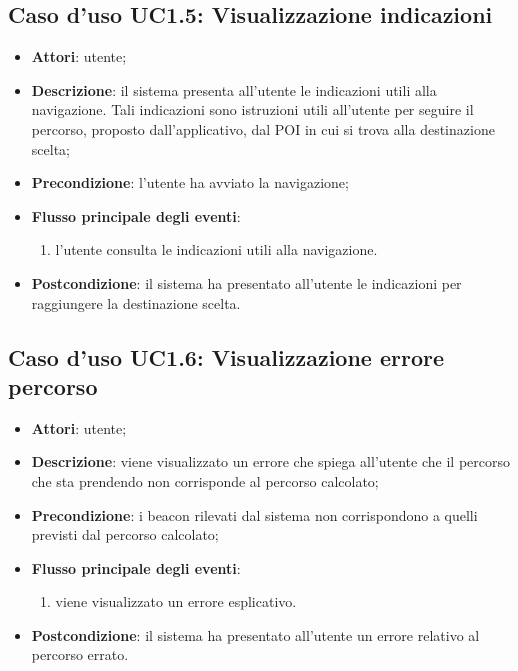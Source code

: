 \documentclass[../AnalisiDeiRequisiti.tex]{subfiles}
\begin{document}
\subsection{Caso d'uso UC1.5: Visualizzazione indicazioni}
\begin{itemize}
	\item \textbf{Attori}: utente;
	\item \textbf{Descrizione}: il sistema presenta all'utente le indicazioni utili alla navigazione. Tali indicazioni sono istruzioni utili all'utente per seguire il percorso, proposto dall'applicativo, dal POI in cui si trova alla destinazione scelta; 
	\item \textbf{Precondizione}: l'utente ha avviato la navigazione;
	
	\item \textbf{Flusso principale degli eventi}:
	\begin{enumerate}
		\item l'utente consulta le indicazioni utili alla navigazione.
		
	\end{enumerate}
	\item \textbf{Postcondizione}: il sistema ha presentato all'utente le indicazioni per raggiungere la destinazione scelta.
\end{itemize}
\hypertarget{UC1.6}{}
\subsection{Caso d'uso UC1.6: Visualizzazione errore percorso}
\begin{itemize}
	\item \textbf{Attori}: utente;
	\item \textbf{Descrizione}: viene visualizzato un errore che spiega all'utente che il percorso che sta prendendo non corrisponde al percorso calcolato; 
	\item \textbf{Precondizione}: i beacon rilevati dal sistema non corrispondono a quelli previsti dal percorso calcolato;
	
	\item \textbf{Flusso principale degli eventi}:
	\begin{enumerate}
		\item viene visualizzato un errore esplicativo.
		
	\end{enumerate}
	\item \textbf{Postcondizione}: il sistema ha presentato all'utente un errore relativo al percorso errato.
\end{itemize}
\hypertarget{UC1.7}{}
\end{document}
